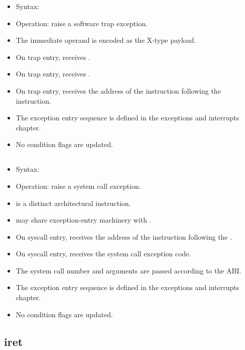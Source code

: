 \begin{itemize}
  \item Syntax: 
  \item Operation: raise a software trap exception.
  \item The immediate operand is encoded as the X-type  payload.
  \item On trap entry,  receives .
  \item On trap entry,  receives .
  \item On trap entry,  receives the address of the instruction following
        the  instruction.
  \item The exception entry sequence is defined in the exceptions and interrupts chapter.
  \item No condition flags are updated.
\end{itemize}

\subsection{}

\begin{itemize}
  \item Syntax: 
  \item Operation: raise a system call exception.
  \item {} is a distinct architectural instruction.
  \item {} may share exception-entry machinery with .
  \item On syscall entry,  receives the address of the instruction following the .
  \item On syscall entry,  receives the system call exception code.
  \item The system call number and arguments are passed according to the ABI.
  \item The exception entry sequence is defined in the exceptions and interrupts chapter.
  \item No condition flags are updated.
\end{itemize}

\subsection{iret}

